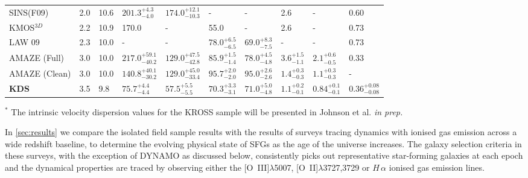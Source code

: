 \documentclass[fleqn,usenatbib]{mnras}
\newcommand{\cmark}{\ding{51}}%
\newcommand{\xmark}{\ding{55}}%
\begin{document}
\begin{table*}
\begin{threeparttable}
\begin{tabular}{llllllllll}
 SINS(F09) & 2.0 & 10.6 &       $201.3^{+4.3}_{-4.0}$  \cmark & $174.0^{+12.1}_{-10.3}$ &  -                    \xmark & -                    & 2.6                  \xmark &           -                   &               0.60                    \xmark   \\[1ex]
 KMOS$^{3D}$ & 2.2 & 10.9 &     170.0                  \xmark & -                       &  55.0                 \xmark & -                    & 2.6                  \xmark &           -                   &               0.73                    \xmark   \\[1ex]
 LAW 09 & 2.3 & 10.0 &          -                      \xmark & -                       &  $78.0^{+6.5}_{-6.5}$ \xmark & $69.0^{+8.3}_{-7.5}$ & -                    \xmark &           -                   &               0.73                    \xmark   \\[1ex]
 AMAZE (Full) & 3.0 & 10.0 &    $217.0^{+59.1}_{-40.2}$\xmark & $129.0^{+47.5}_{-42.8}$ &  $85.9^{+1.5}_{-1.4}$ \xmark & $78.0^{+4.5}_{-4.8}$ & $3.6^{+1.5}_{-1.1}$  \xmark &           $2.1^{+0.6}_{-0.5}$ &               0.33                    \xmark   \\[1ex]
 AMAZE (Clean) & 3.0 & 10.0 &   $140.8^{+40.1}_{-30.2}$\cmark & $129.0^{+45.0}_{-33.4}$ &  $95.7^{+2.0}_{-2.0}$ \cmark & $95.0^{+2.6}_{-2.6}$ & $1.4^{+0.3}_{-0.3}$  \cmark &           $1.1^{+0.3}_{-0.3}$ &               -                       \xmark   \\[1ex]
 \textbf{KDS} & 3.5 & 9.8 &     $75.7^{+4.4}_{-4.4}$   \cmark & $57.5^{+5.5}_{-5.5}$    &  $70.3^{+3.3}_{-3.1}$ \cmark & $71.0^{+5.0}_{-4.8}$ & $1.1^{+0.2}_{-0.1}$  \cmark &            $0.84^{+0.1}_{-0.1}$&               $0.36^{+0.08}_{-0.08}$ \cmark    \\[1ex]
 \hline
\end{tabular}
\begin{tablenotes}
      \small
      \item $^{*}$ The intrinsic velocity dispersion values for the KROSS sample will be presented in Johnson et al. {\it in prep.} 
    \end{tablenotes}
  \end{threeparttable}
  \end{table*}

In \cref{sec:results} we compare the isolated field sample results with the results of surveys tracing dynamics with ionised gas emission across a wide redshift baseline, to determine the evolving physical state of SFGs as the age of the universe increases.
The galaxy selection criteria in these surveys, with the exception of DYNAMO \citep{Green2014} as discussed below, consistently picks out representative star-forming galaxies at each epoch and the dynamical properties are traced by observing either the [O~{\sc III}]$\lambda$5007, [O~{\sc II}]$\lambda$3727,3729 or $H\,\alpha$ ionised gas emission lines.
\end{document}
